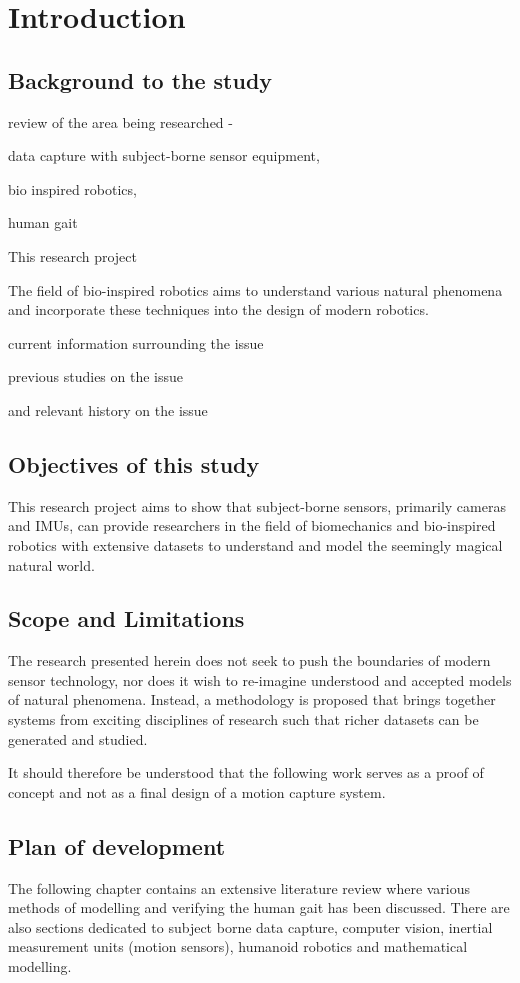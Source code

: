 \chapter{Introduction}
\section{Background to the study}
review of the area being researched - 

data capture with subject-borne sensor equipment, 

bio inspired robotics, 

human gait 

This research project 

The field of bio-inspired robotics aims to understand various natural phenomena and incorporate these techniques into the design of modern robotics. 

current information surrounding the issue 


previous studies on the issue

and relevant history on the issue
  
\section{Objectives of this study}

This research project aims to show that subject-borne sensors, primarily cameras and IMUs, can provide researchers in the field of biomechanics and bio-inspired robotics with extensive datasets to understand and model the seemingly magical natural world. 



\section{Scope and Limitations}
The research presented herein does not seek to push the boundaries of modern sensor technology, nor does it wish to re-imagine understood and accepted models of natural phenomena. Instead, a methodology is proposed that brings together systems from exciting disciplines of research such that richer datasets can be generated and studied.

It should therefore be understood that the following work serves as a proof of concept and not as a final design of a motion capture system.  
  
  
\section{Plan of development}
The following chapter contains an extensive literature review where various methods of modelling and verifying the human gait has been discussed. There are also sections dedicated to subject borne data capture, computer vision, inertial measurement units (motion sensors), humanoid robotics and mathematical modelling.
  
